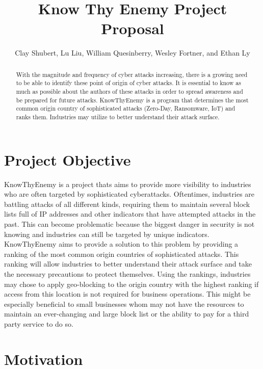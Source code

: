 \documentclass[letterpaper, 10 pt, conference]{ieeeconf}  %
\title{\LARGE \bf
Know Thy Enemy Project Proposal
}
\author{Clay Shubert, Lu Liu, William Quesinberry, Wesley Fortner, and Ethan Ly %
}
\begin{document}
\maketitle
\thispagestyle{empty}
\pagestyle{empty}



\begin{abstract}

With the magnitude and frequency of cyber attacks increasing, there is a growing need to be able to identify these point of origin of cyber attacks. It is essential to know as much as possible about the authors of these attacks in order to spread awareness and be prepared for future attacks. KnowThyEnemy is a program that determines the most common origin country of sophisticated attacks (Zero-Day, Ransomware, IoT) and ranks them. Industries may utilize to better understand their attack surface. 

\end{abstract}



\section{Project Objective}

KnowThyEnemy is a project thats aims to provide more visibility to industries who are often targeted by sophisticated cyberattacks. 
Oftentimes, industries are battling attacks of all different kinds, requiring them to maintain several block lists full of IP addresses and other indicators that have attempted attacks in the past. 
This can become problematic because the biggest danger in security is not knowing and industries can still be targeted by unique indicators. 
KnowThyEnemy aims to provide a solution to this problem by providing a ranking of the most common origin countries of sophisticated attacks. 
This ranking will allow industries to better understand their attack surface and take the necessary precautions to protect themselves. 
Using the rankings, industries may chose to apply geo-blocking to the origin country with the highest ranking if access from this location is not required for business operations.
This might be especially beneficial to small businesses whom may not have the resources to maintain an ever-changing and large block list or the ability to pay for a third party service to do so.

\section{Motivation}
\end{document}
